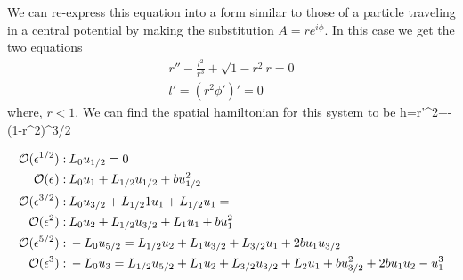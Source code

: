 \documentclass[../main/WavelengthCompetition.tex]{subfiles}
\begin{document}
We can re-express this equation into a form similar to those of a particle traveling in a central potential by making the substitution $A=r e^{i\phi}$. In this case we get the two equations
\begin{subequations}
\begin{align}
r''- \frac{l^2}{r^3}+\sqrt{1-r^2}r=0\\
l'=(r^2 \phi')'=0
\end{align}
\end{subequations}
where, $r<1$.  We can find the spatial hamiltonian for this system to be
\beqn
h=r'^2+-(1-r^2)^{3/2}
\eeqn
 


 
\begin{subequations}
\begin{align}
\mathcal{O}(\epsilon^{1/2}): \:  &L_0 u_{1/2} =0
\label{eq:msh23o05q0} \\
\mathcal{O}(\epsilon^{}): \:  &L_0 u_{1}+L_{1/2} u_{1/2}  +b u_{1/2}^2
\label{eq:msh23o10q0} \\
\mathcal{O}(\epsilon^{3/2}): \: &L_0 u_{3/2} + L_{1/2}1 u_{1}+L_{1/2} u_1 =
\label{eq:msh23o15q0} \\
\mathcal{O}(\epsilon^2): \:  &L_0 u_2 + L_{1/2} u_{3/2} +L_1 u_1 +b u_1^2
\label{eq:msh23o20q0}\\
\mathcal{O}(\epsilon^{5/2}): \:  &-L_0 u_{5/2} = L_{1/2} u_{2} +L_1 u_{3/2}+ L_{3/2} u_1 +2b u_1 u_{3/2}
\label{eq:msh23o25q0}\\
\mathcal{O}(\epsilon^{3}): \:  &-L_0 u_{3} = L_{1/2} u_{5/2} +L_1 u_{2}+ L_{3/2} u_{3/2}+L_2 u_1   +b u_{3/2}^2+2b u_1 u_2 -u_1^3
\label{eq:msh23o30q0}
\end{align}
\end{subequations}
\end{document}
